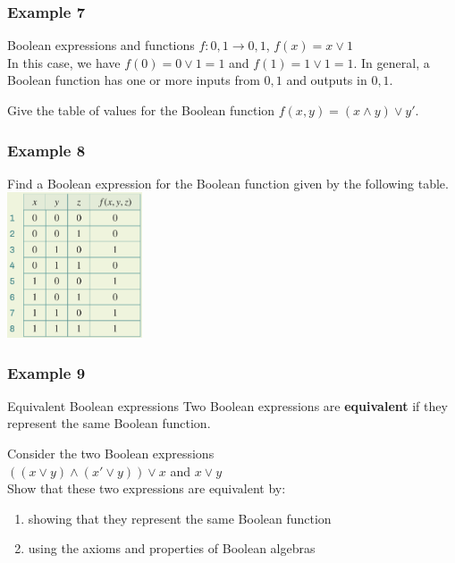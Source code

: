 \documentclass[
	11pt, %
]{beamer}
\begin{document}
\begin{frame}[t]
    \frametitle{Example 7}
    \begin{block}{Boolean expressions and functions}
        $f:{0,1} \rightarrow {0, 1}$, \qquad $f(x) = x \lor 1$\\
        In this case, we have $f(0) = 0 \lor 1 = 1$ and $f(1) = 1\lor 1 = 1$.
        In general, a Boolean function has one or more inputs from ${0, 1}$ and outputs in ${0, 1}$.
    \end{block}
    Give the table of values for the Boolean function $f(x,y) = (x\land y)\lor y'$.
\end{frame}

\begin{frame}[t]
    \frametitle{Example 8}
    Find a Boolean expression for the Boolean function given by the following table.\\
    \includegraphics[width = 4cm]{Ex8.png}
\end{frame}
\begin{frame}
\end{frame}

\begin{frame}[t]
    \frametitle{Example 9}
    \begin{block}{Equivalent Boolean expressions}
        Two Boolean expressions are \textbf{equivalent} if they represent the same Boolean function.        
    \end{block}
    Consider the two Boolean expressions\\
    $((x \lor y) \land (x' \lor y)) \lor x$ and $x \lor y$\\
    Show that these two expressions are equivalent by:\\
    \begin{enumerate}
        \item showing that they represent the same Boolean function
        \item using the axioms and properties of Boolean algebras
    \end{enumerate}
\end{frame}
\end{document}
